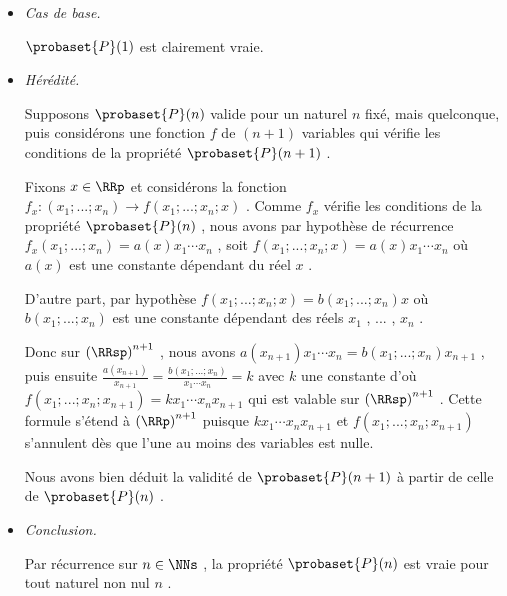 \begin{itemize}[label=\small\textbullet]
	\item \emph{Cas de base.}
	
	\noindent
	$\probaset{P}(1)$ est clairement vraie.


	\medskip
	\item \emph{Hérédité.}
	
	\noindent
	Supposons $\probaset{P}(n)$ valide pour un naturel $n$ fixé, mais quelconque, puis considérons une fonction $f$ de $(n + 1)$ variables qui vérifie les conditions de la propriété $\probaset{P}(n + 1)$ .
	
	\smallskip
	\noindent
	Fixons $x \in \RRp$ et considérons la fonction $f_x : (x_1 ; ... ; x_n) \rightarrow f(x_1 ; ... ; x_n ; x)$ .
	Comme $f_x$  vérifie les conditions de la propriété $\probaset{P}(n)$ ,
	nous avons par hypothèse de récurrence 
	$f_x(x_1 ; ... ; x_n) = a(x) x_1 \cdots x_n$ , soit $f(x_1 ; ... ; x_n ; x) = a(x) x_1 \cdots x_n$ où $a(x)$ est une constante dépendant du réel $x$ .
	
	\smallskip
	\noindent
	D'autre part, par hypothèse $f(x_1 ; ... ; x_n ; x) = b(x_1 ; ... ; x_n) x$ où $b(x_1 ; ... ; x_n)$ est une constante dépendant des réels $x_1$ , ... , $x_n$ .
	
	\smallskip
	\noindent
	Donc sur $\left( \RRsp \right)^{n+1}$ , nous avons
	$a(x_{n+1}) x_1 \cdots x_n = b(x_1 ; ... ; x_n) x_{n+1}$ ,
	puis ensuite
	$\frac{a(x_{n+1})}{x_{n+1}} = \frac{b(x_1 ; ... ; x_n)}{x_1 \cdots x_n} = k$
	avec $k$ une constante d'où
	$f(x_1 ; ... ; x_n ; x_{n+1}) = k x_1 \cdots x_n x_{n+1}$
	qui est valable sur $\left( \RRsp \right)^{n+1}$ .
	Cette formule s'étend à $\left( \RRp \right)^{n+1}$ puisque
	$k x_1 \cdots x_n x_{n+1}$ et $f(x_1 ; ... ; x_n ; x_{n+1})$ s'annulent dès que l'une au moins des variables est nulle.
	
	\smallskip
	\noindent
	Nous avons bien déduit la validité de $\probaset{P}(n+1)$ à partir de celle de $\probaset{P}(n)$ .


	\medskip
	\item \emph{Conclusion.}
	
	\smallskip
	\noindent
	Par récurrence sur $n \in \NNs$ , la propriété $\probaset{P}(n)$ est vraie pour tout naturel non nul $n$ .
\end{itemize} 

